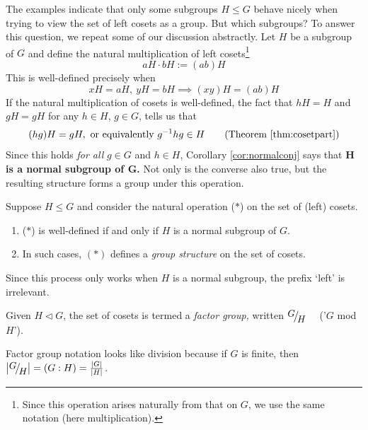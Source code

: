 
The examples indicate that only some subgroups $H\le G$ behave nicely when trying to view the set of left cosets as a group. But which subgroups? To answer this question, we repeat some of our discussion abstractly. Let $H$ be a subgroup of $G$ and define the natural multiplication of left cosets\footnote{Since this operation arises naturally from that on $G$, we use the same notation (here multiplication).}
\[
	aH\cdot bH:=(ab)H \tag{$\ast$}
\]
This is well-defined precisely when
\[
	xH=aH,\ yH=bH \implies (xy)H=(ab)H \tag{$\dag$}
\]
If the natural multiplication of cosets is well-defined, the fact that $hH=H$ and $gH=gH$ for any $h\in H$, $g\in G$, tells us that
\[
 	(hg)H=gH,\text{ or equivalently }	g^{-1}hg\in H \tag{Theorem \ref{thm:cosetpart}}
\]
Since this holds \emph{for all} $g\in G$ and $h\in H$, Corollary \ref{cor:normalconj} says that \textbf{$\boldsymbol{H}$ is a normal subgroup of $\boldsymbol G$.} Not only is the converse also true, but the resulting structure forms a group under this operation.

\begin{thm}{}{}
	Suppose $H\le G$ and consider the natural operation ($\ast$) on the set of (left) cosets.
	\begin{enumerate}
	  \item ($\ast$) is well-defined if and only if $H$ is a normal subgroup of $G$.
	  \item	In such cases, $(\ast)$ defines a \emph{group structure} on the set of cosets.
	\end{enumerate}
\end{thm}

Since this process only works when $H$ is a normal subgroup, the prefix `left' is irrelevant.

\begin{defn}{}{}
	Given $H\triangleleft G$, the set of cosets is termed a \emph{factor group,} written $\quotient GH$ \ \ ('$G$ mod $H$').
\end{defn}

Factor group notation looks like division because if $G$ is finite, then $\nm{\quotient GH}=(G:H)=\frac{\nm G}{\nm H}$.

